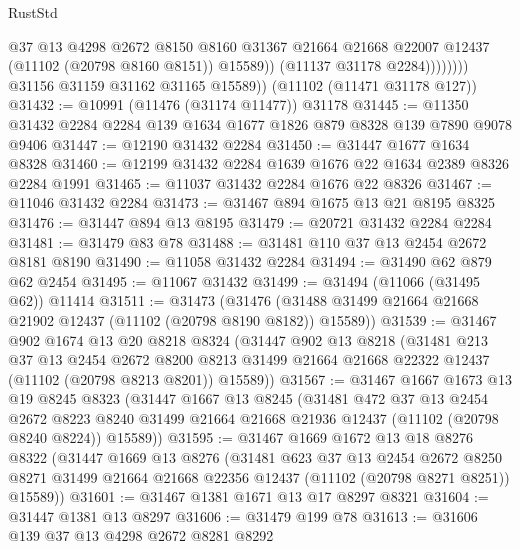 \begin{lexlean}{RustStd}
\begin{coremodule}
                          @37
                          @13
                          @4298
                          @2672
                          @8150
                          @8160
                          @31367
                          @21664
                          @21668
                          @22007
                          @12437
                          (@11102 (@20798 @8160 @8151))
                          @15589))
                      (@11137 @31178 @2284))))))))
        @31156
        @31159
        @31162
        @31165
        @15589))
    (@11102 (@11471 @31178 @127))
@31432 := @10991 (@11476 (@31174 @11477)) @31178
@31445 := @11350 @31432 @2284 @2284 @139 @1634 @1677 @1826 @879 @8328 @139 @7890 @9078 @9406
@31447 := @12190 @31432 @2284
@31450 := @31447 @1677 @1634 @8328
@31460 := @12199 @31432 @2284 @1639 @1676 @22 @1634 @2389 @8326 @2284 @1991
@31465 := @11037 @31432 @2284 @1676 @22 @8326
@31467 := @11046 @31432 @2284
@31473 := @31467 @894 @1675 @13 @21 @8195 @8325
@31476 := @31447 @894 @13 @8195
@31479 := @20721 @31432 @2284 @2284
@31481 := @31479 @83 @78
@31488 := @31481 @110 @37 @13 @2454 @2672 @8181 @8190
@31490 := @11058 @31432 @2284
@31494 := @31490 @62 @879 @62 @2454
@31495 := @11067 @31432
@31499 := @31494 (@11066 (@31495 @62)) @11414
@31511 := @31473
    (@31476 (@31488 @31499 @21664 @21668 @21902 @12437 (@11102 (@20798 @8190 @8182)) @15589))
@31539 := @31467
    @902
    @1674
    @13
    @20
    @8218
    @8324
    (@31447
      @902
      @13
      @8218
      (@31481
        @213
        @37
        @13
        @2454
        @2672
        @8200
        @8213
        @31499
        @21664
        @21668
        @22322
        @12437
        (@11102 (@20798 @8213 @8201))
        @15589))
@31567 := @31467
    @1667
    @1673
    @13
    @19
    @8245
    @8323
    (@31447
      @1667
      @13
      @8245
      (@31481
        @472
        @37
        @13
        @2454
        @2672
        @8223
        @8240
        @31499
        @21664
        @21668
        @21936
        @12437
        (@11102 (@20798 @8240 @8224))
        @15589))
@31595 := @31467
    @1669
    @1672
    @13
    @18
    @8276
    @8322
    (@31447
      @1669
      @13
      @8276
      (@31481
        @623
        @37
        @13
        @2454
        @2672
        @8250
        @8271
        @31499
        @21664
        @21668
        @22356
        @12437
        (@11102 (@20798 @8271 @8251))
        @15589))
@31601 := @31467 @1381 @1671 @13 @17 @8297 @8321
@31604 := @31447 @1381 @13 @8297
@31606 := @31479 @199 @78
@31613 := @31606 @139 @37 @13 @4298 @2672 @8281 @8292

\end{coremodule}
\end{lexlean}
